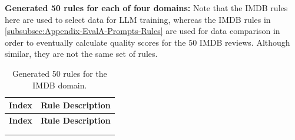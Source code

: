 \documentclass{article}
\newcommand{\mytiny}{\fontsize{8pt}{10pt}\selectfont}
\begin{document}
\textbf{Generated 50 rules for each of four domains:}
Note that the IMDB rules here are used to select data for LLM training, whereas the IMDB rules in \ref{subsubsec:Appendix-EvalA-Prompts-Rules} are used for data comparison in order to eventually calculate quality scores for the $50$ IMDB reviews. Although similar, they are not the same set of rules.

\begingroup
\mytiny
\begin{longtable}{c|p{14cm}} %
\hline
\textbf{Index} & \textbf{Rule Description} \\
\hline
\endfirsthead

\hline
\textbf{Index} & \textbf{Rule Description} \\
\hline
\endhead

\hline
\endfoot

\caption{Generated 50 rules for the IMDB domain.} \label{tab:rules_for_imdb} \\
\endlastfoot


\end{longtable}
\end{document}
